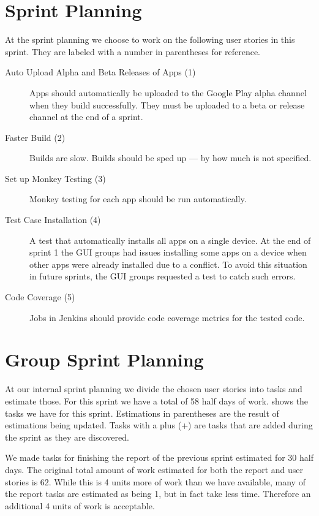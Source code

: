 \section{\bdtitle Sprint Planning}\label{sec:S2_bd}
At the \bd sprint planning we choose to work on the following user stories in this sprint. They are labeled with a number in parentheses for reference.

\begin{description}
  \item[Auto Upload Alpha and Beta Releases of Apps (1)] Apps should automatically be uploaded to the Google Play alpha channel when they build successfully. They must be uploaded to a beta or release channel at the end of a sprint.
  \item[Faster Build (2)] Builds are slow. Builds should be sped up --- by how much is not specified.
  \item[Set up Monkey Testing (3)] Monkey testing for each app should be run automatically.
  \item[Test Case Installation (4)] A test that automatically installs all apps on a single device. At the end of sprint 1 the GUI groups had issues installing some apps on a device when other apps were already installed due to a conflict. To avoid this situation in future sprints, the GUI groups requested a test to catch such errors.
  \item[Code Coverage (5)] Jobs in Jenkins should provide code coverage metrics for the tested code.
\end{description}

\section{Group Sprint Planning}\label{sec:S2_group}
At our internal sprint planning we divide the chosen user stories into tasks and estimate those. For this sprint we have a total of 58 half days of work.  shows the tasks we have for this sprint. Estimations in parentheses are the result of estimations being updated. Tasks with a plus (+) are tasks that are added during the sprint as they are discovered.

We made tasks for finishing the report of the previous sprint estimated for 30 half days. The original total amount of work estimated for both the report and user stories is 62. While this is 4 units more of work than we have available, many of the report tasks are estimated as being 1, but in fact take less time. Therefore an additional 4 units of work is acceptable.

